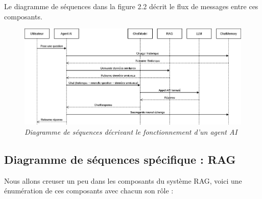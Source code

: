 \documentclass[12pt,a4paper]{report}
\begin{document}
	Le diagramme de séquences dans la figure 2.2 décrit le flux de messages entre ces composants.
	
	\begin{figure}[H]
		\centering
		\includegraphics[width=\textwidth]{ds-ai-agent.drawio.png}
		\caption{\textit{Diagramme de séquences décrivant le fonctionnement d'un agent AI}}
		\label{fig:ds-ai-agent.drawio}
	\end{figure}
	
	\subsection{Diagramme de séquences spécifique : RAG}
	
	Nous allons creuser un peu dans les composants du système RAG, voici une énumération de ces composants avec chacun son rôle :
	
\end{document}
